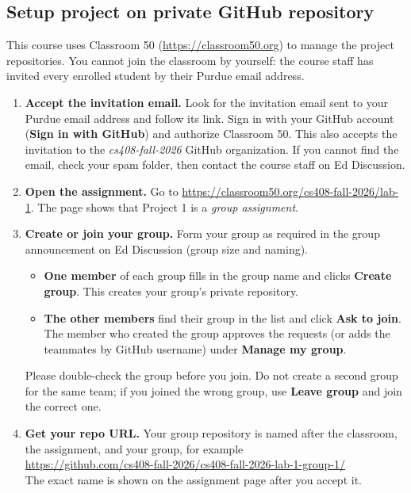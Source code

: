 \documentclass[letterpaper,11pt]{article}
\begin{document}
\subsection{Setup project on private GitHub repository}

This course uses Classroom 50 (\url{https://classroom50.org}) to manage the
project repositories. You cannot join the classroom by yourself: the course staff
has invited every enrolled student by their Purdue email address.

\begin{enumerate}
\item \textbf{Accept the invitation email.}
  Look for the invitation email sent to your Purdue email address and follow
  its link. Sign in with your GitHub account (\textbf{Sign in with GitHub}) and
  authorize Classroom 50. This also accepts the invitation to the
  \emph{cs408-fall-2026} GitHub organization. If you cannot find the email,
  check your spam folder, then contact the course staff on Ed Discussion.

\item \textbf{Open the assignment.}
  Go to \url{https://classroom50.org/cs408-fall-2026/lab-1}. The page shows that
  Project 1 is a \emph{group assignment}.

\item \textbf{Create or join your group.}
  Form your group as required in the group announcement on Ed Discussion
  (group size and naming).
  \begin{itemize}
  \item \textbf{One member} of each group fills in the group name and clicks
    \textbf{Create group}. This creates your group's private repository.
  \item \textbf{The other members} find their group in the list and click
    \textbf{Ask to join}. The member who created the group approves the
    requests (or adds the teammates by GitHub username) under
    \textbf{Manage my group}.
  \end{itemize}
  Please double-check the group before you join. Do not create a second group for
  the same team; if you joined the wrong group, use \textbf{Leave group} and
  join the correct one.

\item \textbf{Get your repo URL.}
  Your group repository is named after the classroom, the assignment, and your
  group, for example\\
  \url{https://github.com/cs408-fall-2026/cs408-fall-2026-lab-1-group-1/}\\
  The exact name is shown on the assignment page after you accept it.
\end{enumerate}
\end{document}
